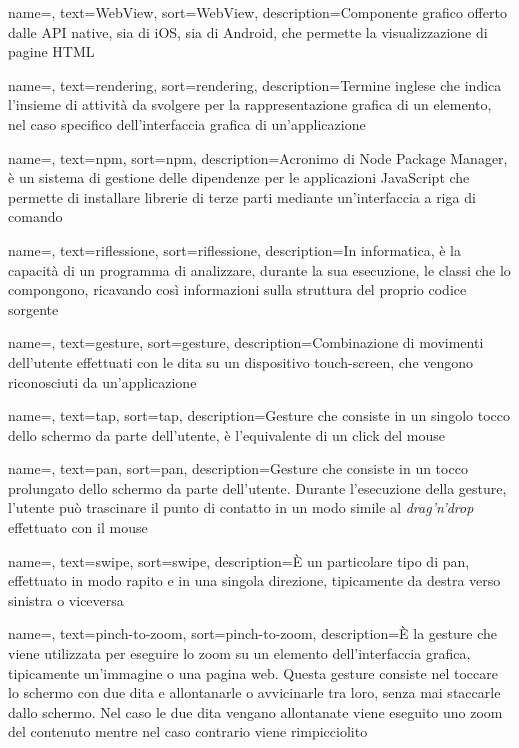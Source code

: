 {
    name=,
    text=WebView,
    sort=WebView,
    description={Componente grafico offerto dalle API native, sia di iOS, sia di Android, che permette la visualizzazione di pagine HTML}
}

{
    name=,
    text=rendering,
    sort=rendering,
    description={Termine inglese che indica l'insieme di attività da svolgere per la rappresentazione grafica di un elemento, nel caso specifico dell'interfaccia grafica di un'applicazione}
}

{
    name=,
    text=npm,
    sort=npm,
    description={Acronimo di Node Package Manager, è un sistema di gestione delle dipendenze per le applicazioni JavaScript che permette di installare librerie di terze parti mediante un'interfaccia a riga di comando}
}

{
    name=,
    text=riflessione,
    sort=riflessione,
    description={In informatica, è la capacità di un programma di analizzare, durante la sua esecuzione, le classi che lo compongono, ricavando così informazioni sulla struttura del proprio codice sorgente}
}
    
{
    name=,
    text=gesture,
    sort=gesture,
    description={Combinazione di movimenti dell'utente effettuati con le dita su un dispositivo touch-screen, che vengono riconosciuti da un'applicazione}
}

{
    name=,
    text=tap,
    sort=tap,
    description={Gesture che consiste in un singolo tocco dello schermo da parte dell'utente, è l'equivalente di un click del mouse}
}

{
    name=,
    text=pan,
    sort=pan,
    description={Gesture che consiste in un tocco prolungato dello schermo da parte dell'utente. Durante l'esecuzione della gesture, l'utente può trascinare il punto di contatto in un modo simile al \textit{drag'n'drop} effettuato con il mouse}
}

{
    name=,
    text=swipe,
    sort=swipe,
    description={\`E un particolare tipo di pan, effettuato in modo rapito e in una singola direzione, tipicamente da destra verso sinistra o viceversa}
}

{
    name=,
    text=pinch-to-zoom,
    sort=pinch-to-zoom,
    description={\`E la gesture che viene utilizzata per eseguire lo zoom su un elemento dell'interfaccia grafica, tipicamente un'immagine o una pagina web. Questa gesture consiste nel toccare lo schermo con due dita e allontanarle o avvicinarle tra loro, senza mai staccarle dallo schermo. Nel caso le due dita vengano allontanate viene eseguito uno zoom del contenuto mentre nel caso contrario viene rimpicciolito}
}

